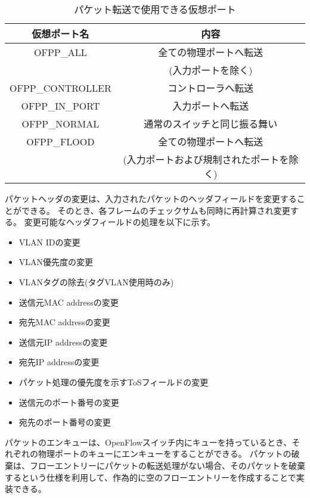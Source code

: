 \begin{table}[tb]
	\begin{center}
		\caption{パケット転送で使用できる仮想ポート}
		\begin{tabular}{c|c}
			\hline \hline
			仮想ポート名 & 内容　\\ \hline
			OFPP\_ALL & 全ての物理ポートへ転送　\\
			　& (入力ポートを除く)　\\
			OFPP\_CONTROLLER & コントローラへ転送 \\
			OFPP\_IN\_PORT & 入力ポートへ転送　\\
			OFPP\_NORMAL & 通常のスイッチと同じ振る舞い　\\
			OFPP\_FLOOD & 全ての物理ポートへ転送　\\
			 & (入力ポートおよび規制されたポートを除く) \\ \hline
		\end{tabular}
		\label{tab:2-2}
	\end{center}
\end{table}

パケットヘッダの変更は、入力されたパケットのヘッダフィールドを変更することができる。
そのとき、各フレームのチェックサムも同時に再計算され変更する。
変更可能なヘッダフィールドの処理を以下に示す。

\begin{itemize}
	\item VLAN IDの変更
	\item VLAN優先度の変更
	\item VLANタグの除去(タグVLAN使用時のみ)
	\item 送信元MAC addressの変更
	\item 宛先MAC addressの変更
	\item 送信元IP addressの変更
	\item 宛先IP addressの変更
	\item パケット処理の優先度を示すToSフィールドの変更
	\item 送信元のポート番号の変更
	\item 宛先のポート番号の変更
\end{itemize}

パケットのエンキューは、OpenFlowスイッチ内にキューを持っているとき、それぞれの物理ポートのキューにエンキューをすることができる。
パケットの破棄は、フローエントリーにパケットの転送処理がない場合、そのパケットを破棄するという仕様を利用して、作為的に空のフローエントリーを作成することで実装できる。


